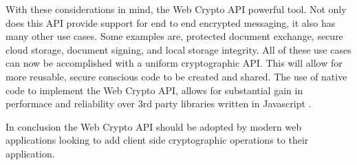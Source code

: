With these considerations in mind, the Web Crypto API powerful tool. Not only does this API provide support for end to end encrypted messaging, it also has many other use cases. Some examples are, protected document exchange, secure cloud storage, document signing, and local storage integrity. All of these use cases can now be accomplished with a uniform cryptographic API. This will allow for more reusable, secure conscious code to be created and shared. The use of native code to implement the Web Crypto API, allows for substantial gain in performace and reliability over 3rd party libraries written in Javascript \cite{pref}. 


In conclusion the Web Crypto API should be adopted by modern web applications looking to add client side cryptographic operations to their application.
